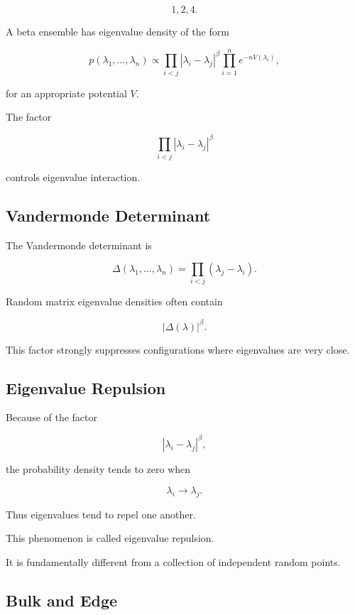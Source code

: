 \[
1,2,4.
\]

A beta ensemble has eigenvalue density of the form

\[
\boxed{
p(\lambda_1,\ldots,\lambda_n)
\propto
\prod_{i<j}
|\lambda_i-\lambda_j|^\beta
\prod_{i=1}^{n}
e^{-nV(\lambda_i)},
}
\]

for an appropriate potential \(V\).

The factor

\[
\prod_{i<j}
|\lambda_i-\lambda_j|^\beta
\]

controls eigenvalue interaction.

\subsection{Vandermonde Determinant}
\label{subsec:vandermonde-random-matrix}

The Vandermonde determinant is

\[
\boxed{
\Delta(\lambda_1,\ldots,\lambda_n)
=
\prod_{i<j}
(\lambda_j-\lambda_i).
}
\]

Random matrix eigenvalue densities often contain

\[
\boxed{
|\Delta(\lambda)|^\beta.
}
\]

This factor strongly suppresses configurations where eigenvalues are
very close.

\subsection{Eigenvalue Repulsion}
\label{subsec:eigenvalue-repulsion}

Because of the factor

\[
|\lambda_i-\lambda_j|^\beta,
\]

the probability density tends to zero when

\[
\lambda_i\to\lambda_j.
\]

Thus eigenvalues tend to repel one another.

This phenomenon is called eigenvalue repulsion.

It is fundamentally different from a collection of independent random
points.

\subsection{Bulk and Edge}
\label{subsec:bulk-and-edge-rmt}

